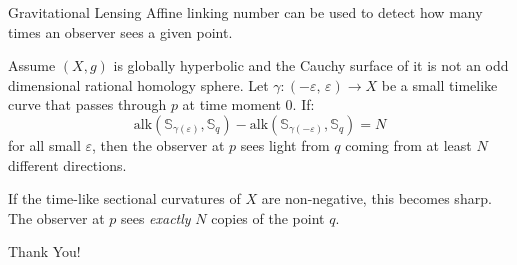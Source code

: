 \documentclass{beamer}
\begin{document}
    \begin{frame}{Gravitational Lensing}
        Affine linking number can be used to detect how many times an observer
        sees a given point.
        \begin{theorem}
            Assume $(X, g)$ is globally hyperbolic and the Cauchy surface
            of it is not an odd dimensional rational homology sphere.
            Let $\gamma:(-\varepsilon,\,\varepsilon)\rightarrow{X}$
            be a small timelike curve that passes through $p$ at time moment 0.
            If:
            \begin{equation}
                \textrm{alk}(\mathbb{S}_{\gamma(\varepsilon)}, \mathbb{S}_{q})-
                \textrm{alk}(\mathbb{S}_{\gamma(-\varepsilon)}, \mathbb{S}_{q})
                =N
            \end{equation}
            for all small $\varepsilon$, then the observer at $p$ sees light
            from $q$ coming from at least $N$ different directions.
        \end{theorem}
        If the time-like sectional curvatures of $X$ are non-negative, this
        becomes sharp. The observer at $p$ sees \textit{exactly} $N$ copies of
        the point $q$.
    \end{frame}
    \begin{frame}
        \begin{center}
            Thank You!
        \end{center}
    \end{frame}
\end{document}
